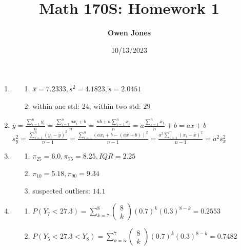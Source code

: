 \documentclass[10pt]{article}
\title{\bf Math 170S: Homework 1}
\date{10/13/2023}
\author{\bf Owen Jones}
\begin{document}
\maketitle
\begin{enumerate}[label=\textbf{Problem \arabic*.}]
    \item \begin{itemize}
        \item [1.] $\overline{x}=7.2333,s^2=4.1823,s=2.0451$
        \item [2.] within one std: $24$, within two std: $29$
    \end{itemize}
    \item $\overline{y}=\frac{\displaystyle\sum_{i=1}^{n}y_i}{n}=\frac{\displaystyle\sum_{i=1}^{n}ax_i+b}{n}=\frac{\displaystyle nb+a\sum_{i=1}^{n}x_i}{n}=a\frac{\displaystyle\sum_{i=1}^{n}x_1}{n}+b=a\overline{x}+b$\\
    $s_y^2=\frac{\displaystyle \sum_{i=1}^{n}{(y_i-\overline{y})}^2}{n-1}=\frac{\displaystyle \sum_{i=1}^{n}{(ax_i+b-(a\overline{x}+b))}^2}{n-1}=\frac{\displaystyle a^2\sum_{i=1}^{n}{(x_i-\overline{x})}^2}{n-1}=a^2s_x^2$
    \item \begin{itemize}
        \item [1.] $\pi_{25}=6.0,\pi_{75}=8.25,IQR=2.25$
        \item [2.] $\pi_{10}=5.18,\pi_{90}=9.34$
        \item [3.] suspected outliers: $14.1$
    \end{itemize}
    \item \begin{itemize}
        \item [1.] $P(Y_7<27.3)=\displaystyle\sum_{k=7}^{8}\begin{pmatrix}
            8\\
            k
        \end{pmatrix} {(0.7)}^k{(0.3)}^{8-k}=0.2553$
        \item [2.]  $P(Y_5<27.3<Y_8)=\displaystyle\sum_{k=5}^{7}\begin{pmatrix}
            8\\
            k
        \end{pmatrix} {(0.7)}^k{(0.3)}^{8-k}=0.7482$
    \end{itemize}
    \begin{figure}[H]
        \centering

\end{figure}
\end{enumerate}
\end{document}
